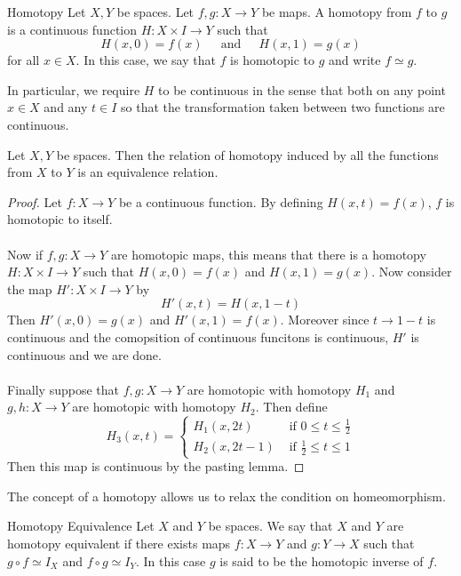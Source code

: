 \documentclass[a4paper]{article}
\begin{document}
\begin{defn}{Homotopy}{} Let $X,Y$ be spaces. Let $f,g:X\to Y$ be maps. A homotopy from $f$ to $g$ is a continuous function $H:X\times I\to Y$ such that $$H(x,0)=f(x)\;\;\;\;\text{ and }\;\;\;\;H(x,1)=g(x)$$ for all $x\in X$. In this case, we say that $f$ is homotopic to $g$ and write $f\simeq g$. 
\end{defn}

In particular, we require $H$ to be continuous in the sense that both on any point $x\in X$ and any $t\in I$ so that the transformation taken between two functions are continuous. 

\begin{prp}{}{} Let $X,Y$ be spaces. Then the relation of homotopy induced by all the functions from $X$ to $Y$ is an equivalence relation. \tcbline
\begin{proof}
Let $f:X\to Y$ be a continuous function. By defining $H(x,t)=f(x)$, $f$ is homotopic to itself. \\~\\
Now if $f,g:X\to Y$ are homotopic maps, this means that there is a homotopy $H:X\times I\to Y$ such that $H(x,0)=f(x)$ and $H(x,1)=g(x)$. Now consider the map $H':X\times I\to Y$ by $$H'(x,t)=H(x,1-t)$$ Then $H'(x,0)=g(x)$ and $H'(x,1)=f(x)$. Moreover since $t\to 1-t$ is continuous and the comopsition of continuous funcitons is continuous, $H'$ is continuous and we are done. \\~\\
Finally suppose that $f,g:X\to Y$ are homotopic with homotopy $H_1$ and $g,h:X\to Y$ are homotopic with homotopy $H_2$. Then define $$H_3(x,t)=\begin{cases}
H_1(x,2t) & \text{ if } 0\leq t\leq\frac{1}{2}\\
H_2(x,2t-1) & \text{ if } \frac{1}{2}\leq t\leq 1
\end{cases}$$
Then this map is continuous by the pasting lemma. 
\end{proof}
\end{prp}

The concept of a homotopy allows us to relax the condition on homeomorphism. 

\begin{defn}{Homotopy Equivalence}{} Let $X$ and $Y$ be spaces. We say that $X$ and $Y$ are homotopy equivalent if there exists maps $f:X\to Y$ and $g:Y\to X$ such that $g\circ f\simeq I_X$ and $f\circ g\simeq I_Y$. In this case $g$ is said to be the homotopic inverse of $f$. 
\end{defn}
\end{document}
